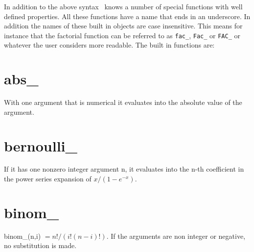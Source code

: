 



\noindent In addition to the above syntax \FORM\ knows a number of special 
functions with well defined properties. All these functions have a name 
that ends in an underscore. In addition the names of these built in objects 
are case insensitive. This means for instance that the factorial function 
can be referred to as \verb:fac_:, \verb:Fac_: or \verb:FAC_: or whatever 
the user considers more readable. The built in functions are:


\section{abs\_}
\label{funabs}
\noindent With one argument that is numerical it evaluates into the 
absolute value of the argument.


\section{bernoulli\_}
\label{funbernoulli}
\noindent If it has one nonzero integer argument n, it evaluates into 
the n-th coefficient in the power series expansion of $x/(1-e^{-x})$.


\section{binom\_}
\label{funbinom}
\noindent binom\_(n,i) $= n!/(i!(n-i)!)$. If the arguments are non 
integer or negative, no substitution is made.

